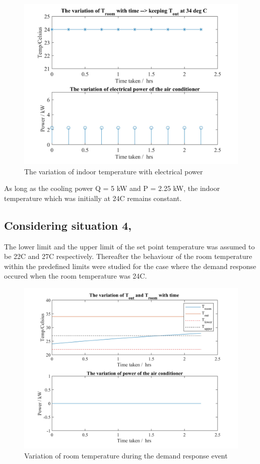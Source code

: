 \documentclass[12pt,a4paper]{article}
\begin{document}
\begin{figure}[h!]
    \centering
    \includegraphics[width=13cm]{images/constant_P_and_T.jpg}
    \caption{The variation of indoor temperature with electrical power}
    \label{fig:constant_P}
\end{figure}

As long as the cooling power Q = 5 kW and P = 2.25 kW, the indoor temperature which was initially at 24\degree C remains constant.

\subsection*{Considering situation 4,}

The lower limit and the upper limit of the set point temperature was assumed to be 22\degree C and 27\degree C respectively. Thereafter the behaviour of the room temperature within the predefined limits were studied for the case where the demand response occured when the room temperature was 24\degree C.

\pagebreak

\begin{figure}[htb!]
    \centering
    \includegraphics[width=14cm]{images/power_at_zero_with_set_limits.jpg}
    \caption{Variation of room temperature during the demand response event}
    \label{fig:with_set_limits}
\end{figure}
\end{document}
